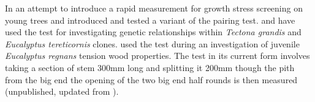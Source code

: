 In an attempt to introduce a rapid measurement for growth stress screening on young trees \cite{Chauhan_2010} and \cite{Entwistle_2014} introduced and tested a variant of the pairing test. \cite{naranjo2012early} and \cite{Aggarwal_2013} have used the test for investigating genetic relationships within \textit{Tectona grandis} and \textit{Eucalyptus tereticornis} clones. \cite{Chauhan_2011} used the test during an investigation of juvenile \textit{Eucalyptus regnans} tension wood properties. The test in its current form involves taking a section of stem 300mm long and splitting it 200mm though the pith from the big end the opening of the two big end half rounds is then measured (unpublished, updated from \cite{Chauhan_2011}).  